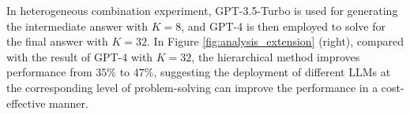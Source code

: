 In heterogeneous combination experiment, GPT-3.5-Turbo is used for generating the intermediate answer with $K=8$, and GPT-4 is then employed to solve for the final answer with $K=32$. In Figure \ref{fig:analysis_extension} (right), compared with the result of GPT-4 with $K=32$, the hierarchical method improves performance from $35\%$ to $47\%$, suggesting the deployment of different LLMs at the corresponding level of problem-solving can improve the performance in a cost-effective manner.




